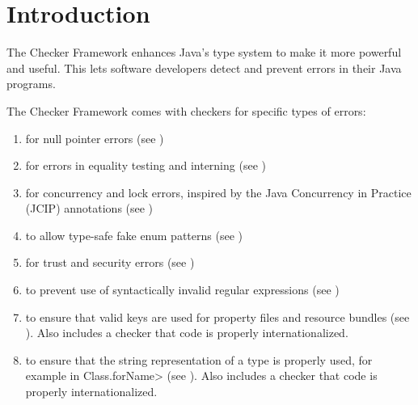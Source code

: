 \htmlhr
\chapter{Introduction\label{introduction}}

The Checker Framework enhances Java's type system to make it more powerful
and useful.
This lets software developers detect and
prevent errors in their Java programs.

The Checker Framework comes with checkers for specific types of errors:

\begin{enumerate}

\item
   for null pointer errors
  (see )
\item
   for errors in equality
  testing and interning (see )
\item
   for concurrency and lock errors,
  inspired by the Java Concurrency in Practice (JCIP) annotations (see
  )
\item
   to allow type-safe fake enum
  patterns (see )
\item
   for trust and security errors
  (see )
\item
   to prevent use of syntactically
  invalid regular expressions (see )
\item
   to ensure that valid
  keys are used for property files and resource bundles (see
  ).
  Also includes a checker that code is properly internationalized.
\item
   to ensure that the
  string representation of a type is properly used, for example in
  \<Class.forName> (see ).
  Also includes a checker that code is properly internationalized.

\end{enumerate}
